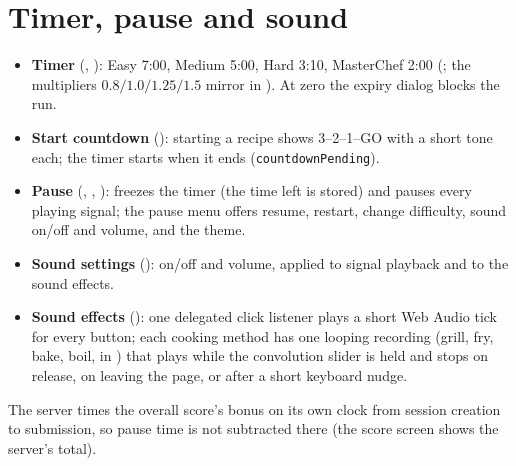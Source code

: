 \documentclass[11pt,a4paper]{article}
\begin{document}
\section{Timer, pause and sound}
\begin{itemize}
\item \textbf{Timer} (, ): Easy 7:00, Medium 5:00, Hard
  3:10, MasterChef 2:00 (; the multipliers $0.8/1.0/1.25/1.5$ mirror
   in ). At zero the expiry dialog blocks the run.
\item \textbf{Start countdown} (): starting a recipe
  shows 3--2--1--GO with a short tone each; the timer starts when it ends
  (\texttt{countdownPending}).
\item \textbf{Pause} (, , ):
  freezes the timer (the time left is stored) and pauses every playing signal; the pause menu
  offers resume, restart, change difficulty, sound on/off and volume, and the theme.
\item \textbf{Sound settings} (): on/off and volume, applied to signal playback
  and to the sound effects.
\item \textbf{Sound effects} (): one delegated click listener plays a short Web
  Audio tick for every button; each cooking method has one looping recording (grill, fry, bake,
  boil, in ) that plays while the convolution slider is held and stops on
  release, on leaving the page, or after a short keyboard nudge.
\end{itemize}
The server times the overall score's bonus on its own clock from session creation to submission,
so pause time is not subtracted there (the score screen shows the server's total).

\end{document}
